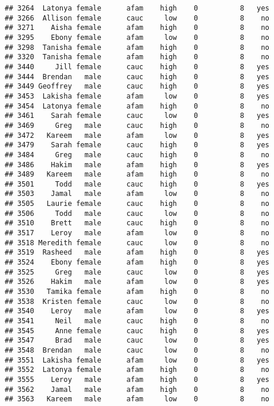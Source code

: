 \documentclass[
]{article}
\begin{document}
\begin{verbatim}
## 3264  Latonya female      afam    high    0          8   yes
## 3266  Allison female      cauc     low    0          8    no
## 3271    Aisha female      afam    high    0          8    no
## 3295    Ebony female      afam     low    0          8    no
## 3298  Tanisha female      afam    high    0          8    no
## 3320  Tanisha female      afam    high    0          8    no
## 3440     Jill female      cauc    high    0          8   yes
## 3444  Brendan   male      cauc    high    0          8   yes
## 3449 Geoffrey   male      cauc    high    0          8   yes
## 3453  Lakisha female      afam     low    0          8   yes
## 3454  Latonya female      afam    high    0          8    no
## 3461    Sarah female      cauc     low    0          8   yes
## 3469     Greg   male      cauc    high    0          8    no
## 3472   Kareem   male      afam     low    0          8   yes
## 3479    Sarah female      cauc    high    0          8   yes
## 3484     Greg   male      cauc    high    0          8    no
## 3486    Hakim   male      afam    high    0          8   yes
## 3489   Kareem   male      afam    high    0          8    no
## 3501     Todd   male      cauc    high    0          8   yes
## 3503    Jamal   male      afam     low    0          8    no
## 3505   Laurie female      cauc    high    0          8    no
## 3506     Todd   male      cauc     low    0          8    no
## 3510    Brett   male      cauc    high    0          8    no
## 3517    Leroy   male      afam     low    0          8    no
## 3518 Meredith female      cauc     low    0          8    no
## 3519  Rasheed   male      afam    high    0          8   yes
## 3524    Ebony female      afam    high    0          8   yes
## 3525     Greg   male      cauc     low    0          8   yes
## 3526    Hakim   male      afam     low    0          8   yes
## 3530   Tamika female      afam    high    0          8    no
## 3538  Kristen female      cauc     low    0          8    no
## 3540    Leroy   male      afam     low    0          8   yes
## 3541     Neil   male      cauc    high    0          8    no
## 3545     Anne female      cauc    high    0          8   yes
## 3547     Brad   male      cauc     low    0          8   yes
## 3548  Brendan   male      cauc     low    0          8    no
## 3551  Lakisha female      afam     low    0          8   yes
## 3552  Latonya female      afam    high    0          8    no
## 3555    Leroy   male      afam    high    0          8   yes
## 3562    Jamal   male      afam    high    0          8    no
## 3563   Kareem   male      afam     low    0          8    no

\end{verbatim}
\end{document}
